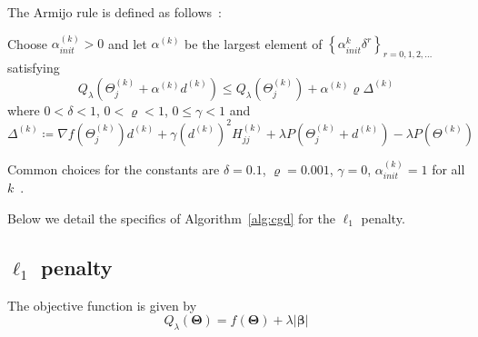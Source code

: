 \documentclass[12pt,letter]{article}\usepackage[]{graphicx}\usepackage[]{color}
\newcommand{\bX}{\textbf{X}}
\newcommand{\bY}{\textbf{Y}}
\newcommand{\bXtilde}{\widetilde{\bX}}
\newcommand{\bYtilde}{\widetilde{\bY}}
\newcommand{\bTheta}{\boldsymbol{\Theta}}
\newcommand{\bbeta}{\boldsymbol{\beta}}
\begin{document}

The Armijo rule is defined as follows~\citep{tseng2009coordinate}:
\begin{tcolorbox}
	Choose $\alpha_{init}^{(k)}>0$ and let $\alpha^{(k)}$ be the largest element of $\left\lbrace \alpha_{init}^k \delta^r \right\rbrace_{r = 0,1,2,\ldots} $ satisfying
	\begin{equation}
		Q_{\lambda}(\Theta_j^{(k)} + \alpha^{(k)} d^{(k)}) \leq Q_{\lambda} (\Theta_j^{(k)}) + \alpha^{(k)}\varrho \Delta^{(k)}
	\end{equation}
	where $0 < \delta <1$, $0 < \varrho <1$, $0 \leq \gamma < 1$ and
	\begin{equation}
		\Delta^{(k)} \coloneqq \nabla f(\Theta_j^{(k)})d^{(k)} + \gamma (d^{(k)})^2 H^{(k)}_{jj} + \lambda P(\Theta_j^{(k)} + d^{(k)}) - \lambda P(\Theta^{(k)})
	\end{equation}
\end{tcolorbox}
Common choices for the constants are $\delta=0.1$, $\varrho=0.001$, $\gamma = 0$, $\alpha_{init}^{(k)} = 1$ for all $k$~\citep{schelldorfer2011estimation}.

Below we detail the specifics of Algorithm~\ref{alg:cgd} for the $\ell_1$ penalty.

\subsection{$\ell_1$ penalty}\label{subsec:l1penalty}

The objective function is given by
\begin{equation}
	Q_{\lambda}(\bTheta) = f(\bTheta) + \lambda |\bbeta|
\end{equation}
\end{document}
